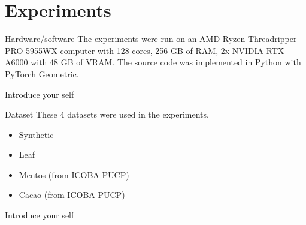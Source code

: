 \documentclass[aspectratio=169]{beamer}
\begin{document}
\section{Experiments}
    \begin{frame}{Hardware/software}
        The experiments were run on an AMD Ryzen Threadripper PRO 5955WX computer with 128 cores, 256 GB of RAM, 2x NVIDIA RTX A6000 with 48 GB of VRAM. The source code was implemented in Python with PyTorch Geometric.

        \begin{note}
            {Introduce your self}
        \end{note}
    \end{frame}

    \begin{frame}{Dataset}
        These 4 datasets were used in the experiments. \\
        
        \begin{itemize}
            \item Synthetic
            \item Leaf \cite{gonzalez2023climate}
            \item Mentos (from ICOBA-PUCP)
            \item Cacao (from ICOBA-PUCP)
        \end{itemize}


        \begin{note}
            {Introduce your self}
        \end{note}
    \end{frame}
\end{document}
